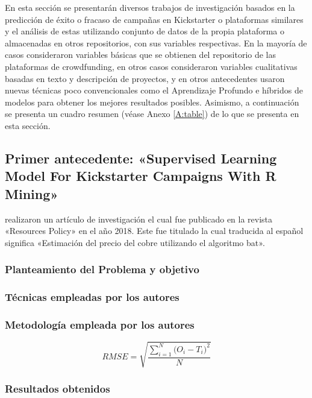 En esta sección se presentarán diversos trabajos de investigación basados en la predicción de éxito o fracaso de campañas en Kickstarter o plataformas similares y el análisis de estas utilizando conjunto de datos de la propia plataforma o almacenadas en otros repositorios, con sus variables respectivas. En la mayoría de casos consideraron variables básicas que se obtienen del repositorio de las plataformas de crowdfunding, en otros casos consideraron variables cualitativas basadas en texto y descripción de proyectos, y en otros antecedentes usaron nuevas técnicas poco convencionales como el Aprendizaje Profundo e híbridos de modelos para obtener los mejores resultados posibles.
Asimismo, a continuación se presenta un cuadro resumen (véase Anexo \ref{A:table}) de lo que se presenta en esta sección.

\subsection{Primer antecedente: «Supervised Learning Model For Kickstarter Campaigns With R Mining» \citep*{pr_kamath2018suplearn}}
\citeauthor{pr_kamath2018suplearn} realizaron un artículo de investigación el cual fue publicado en la revista «Resources Policy» en el año 2018. Este fue titulado  la cual traducida al español significa «Estimación del precio del cobre utilizando el algoritmo bat».

\subsubsection{Planteamiento del Problema y objetivo }


\subsubsection{Técnicas empleadas por los autores}
 

\subsubsection{Metodología empleada por los autores}

\begin{equation}  
\label{eq:RMSE}
RMSE = \sqrt{\frac{\sum_{i=1}^{N}{\Big(O_i -T_i\Big)^2}}{N}}
\end{equation}


\subsubsection{Resultados obtenidos}



